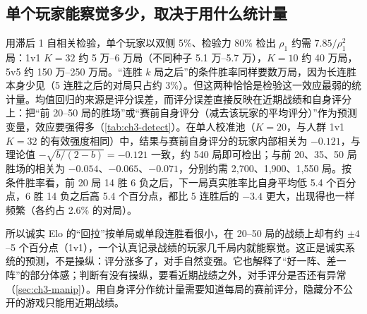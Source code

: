 \subsection{单个玩家能察觉多少，取决于用什么统计量}
\label{sec:ch3-detect}

用滞后 1 自相关检验，单个玩家以双侧 5\%、检验力 80\% 检出 $\rho_1$ 约需 $7.85/\rho_1^2$ 局：1v1 $K=32$ 约 5 万–6 万局（不同种子 5.1 万–5.7 万），$K=10$ 约 40 万局，5v5 约 150 万–250 万局\tagOwn{}。“连胜 $k$ 局之后”的条件胜率同样要数万局，因为长连胜本身少见（5 连胜之后的对局只占约 3\%）。但这两种恰恰是检验这一效应最弱的统计量。均值回归的来源是评分误差，而评分误差直接反映在近期战绩和自身评分上：把“前 20–50 局的胜场”或“赛前自身评分（减去该玩家的平均评分）”作为预测变量，效应要强得多（\cref{tab:ch3-detect}）。在单人校准池（$K=20$，与人群 1v1 $K=32$ 的有效强度相同）中，结果与赛前自身评分的玩家内部相关为 $-0.121$，与理论值 $-\sqrt{b/(2-b)}=-0.121$ 一致，约 540 局即可检出；与前 20、35、50 局胜场的相关为 $-0.054$、$-0.065$、$-0.071$，分别约需 2,700、1,900、1,550 局。按条件胜率看，前 20 局 14 胜 6 负之后，下一局真实胜率比自身平均低 5.4 个百分点，6 胜 14 负之后高 5.4 个百分点，都比 5 连胜后的 $-3.4$ 更大，出现得也一样频繁（各约占 2.6\% 的对局）\tagOwn{}。

所以诚实 Elo 的“回拉”按单局或单段连胜看很小，在 20–50 局的战绩上却有约 $\pm4$–5 个百分点（1v1），一个认真记录战绩的玩家几千局内就能察觉。这正是诚实系统的预测，不是操纵：评分涨多了，对手自然变强。它也解释了“好一阵、差一阵”的部分体感；判断有没有操纵，要看近期战绩之外，对手评分是否还有异常（\cref{sec:ch3-manip}）。用自身评分作统计量需要知道每局的赛前评分，隐藏分不公开的游戏只能用近期战绩。

